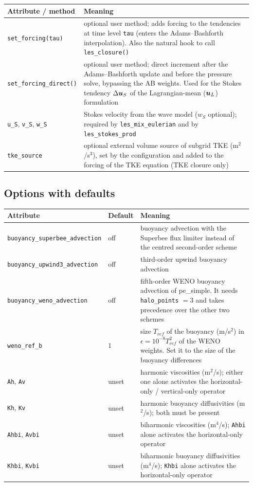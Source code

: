 \documentclass[12pt]{article}
\renewcommand{\v}[1]{{\mbox{\boldmath$ #1 $}}}  %
\begin{document}
\begin{longtable}{@{}lp{10.6cm}@{}}
\hline
Attribute / method & Meaning \\
\hline
\endhead
\verb|set_forcing(tau)| & optional user method; adds forcing to the
  tendencies at time level \verb|tau| (enters the Adams--Bashforth
  interpolation). Also the natural hook to call \verb|les_closure()| \\
\verb|set_forcing_direct()| & optional user method; direct increment after
  the Adams--Bashforth update and before the pressure solve, bypassing the
  AB weights. Used for the Stokes tendency $\Delta \v u_S$ of the
  Lagrangian-mean ($\v u_L$) formulation \\
\verb|u_S|, \verb|v_S|, \verb|w_S| & Stokes velocity from the wave model
  ($w_S$ optional); required by \verb|les_mix_eulerian| and by
  \verb|les_stokes_prod| \\
\verb|tke_source| & optional external volume source of subgrid TKE
  (m$^2$/s$^3$), set by the configuration and added to the forcing of the
  TKE equation (TKE closure only) \\
\hline
\end{longtable}

\subsection*{Options with defaults}

\begin{longtable}{@{}llp{7.9cm}@{}}
\hline
Attribute & Default & Meaning \\
\hline
\endhead
\verb|buoyancy_superbee_advection| & off & buoyancy advection with the
  Superbee flux limiter instead of the centred second-order scheme \\
\verb|buoyancy_upwind3_advection| & off & third-order upwind buoyancy
  advection \\
\verb|buoyancy_weno_advection| & off & fifth-order WENO buoyancy advection
  of pe\_simple. It needs \verb|halo_points| $=3$ and takes precedence
  over the other two schemes \\
\verb|weno_ref_b| & $1$ & size $T_{ref}$ of the buoyancy (m/s$^2$) in
  $\epsilon = 10^{-8} T_{ref}^2$ of the WENO weights. Set it to the size of
  the buoyancy differences \\
\verb|Ah|, \verb|Av| & unset & harmonic viscosities (m$^2$/s); either one
  alone activates the horizontal-only / vertical-only operator \\
\verb|Kh|, \verb|Kv| & unset & harmonic buoyancy diffusivities (m$^2$/s);
  both must be present \\
\verb|Ahbi|, \verb|Avbi| & unset & biharmonic viscosities (m$^4$/s);
  \verb|Ahbi| alone activates the horizontal-only operator \\
\verb|Khbi|, \verb|Kvbi| & unset & biharmonic buoyancy diffusivities
  (m$^4$/s); \verb|Khbi| alone activates the horizontal-only operator \\
\hline
\end{longtable}
\end{document}
